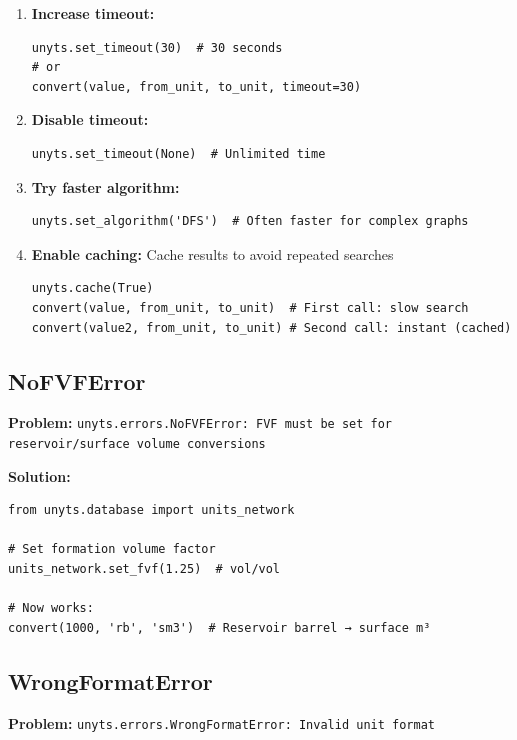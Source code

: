 \documentclass[11pt,a4paper]{report}
\begin{document}
\begin{enumerate}
\item \textbf{Increase timeout:}
\begin{lstlisting}[style=pythonstyle]
unyts.set_timeout(30)  # 30 seconds
# or
convert(value, from_unit, to_unit, timeout=30)
\end{lstlisting}

\item \textbf{Disable timeout:}
\begin{lstlisting}[style=pythonstyle]
unyts.set_timeout(None)  # Unlimited time
\end{lstlisting}

\item \textbf{Try faster algorithm:}
\begin{lstlisting}[style=pythonstyle]
unyts.set_algorithm('DFS')  # Often faster for complex graphs
\end{lstlisting}

\item \textbf{Enable caching:} Cache results to avoid repeated searches
\begin{lstlisting}[style=pythonstyle]
unyts.cache(True)
convert(value, from_unit, to_unit)  # First call: slow search
convert(value2, from_unit, to_unit) # Second call: instant (cached)
\end{lstlisting}
\end{enumerate}

\subsection{NoFVFError}

\textbf{Problem:} \texttt{unyts.errors.NoFVFError: FVF must be set for reservoir/surface volume conversions}

\textbf{Solution:}
\begin{lstlisting}[style=pythonstyle]
from unyts.database import units_network

# Set formation volume factor
units_network.set_fvf(1.25)  # vol/vol

# Now works:
convert(1000, 'rb', 'sm3')  # Reservoir barrel → surface m³
\end{lstlisting}

\subsection{WrongFormatError}

\textbf{Problem:} \texttt{unyts.errors.WrongFormatError: Invalid unit format}
\end{document}
